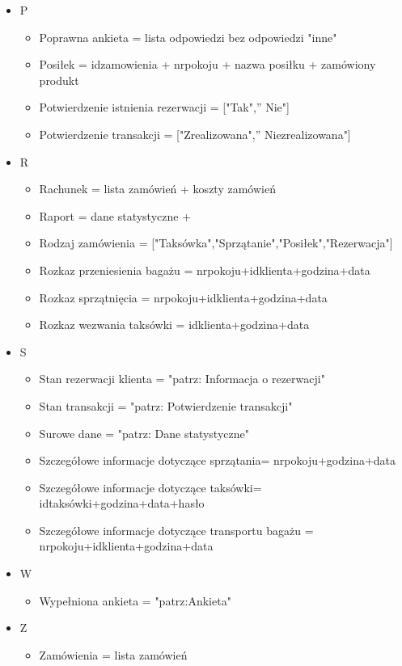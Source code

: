 \documentclass[a4paper, 11pt]{article}
\begin{document}
\begin{itemize}
		
		\item P
		\begin{itemize}
			\item Poprawna ankieta = lista odpowiedzi bez odpowiedzi "inne"
			\item Posiłek = idzamowienia + nrpokoju + nazwa posiłku + zamówiony produkt
			\item Potwierdzenie istnienia rezerwacji = ["Tak",'' Nie"]
			\item Potwierdzenie transakcji = ["Zrealizowana",'' Niezrealizowana"]
		\end{itemize}
		\item R
		\begin{itemize}
			\item Rachunek = lista zamówień + koszty zamówień
			\item Raport = dane statystyczne + 
			\item Rodzaj zamówienia = ["Taksówka","Sprzątanie","Posiłek","Rezerwacja"]
			\item Rozkaz przeniesienia bagażu = nrpokoju+idklienta+godzina+data
			\item Rozkaz sprzątnięcia = nrpokoju+idklienta+godzina+data
			\item Rozkaz wezwania taksówki = idklienta+godzina+data
		\end{itemize}
		\item S
		\begin{itemize}
			\item Stan rezerwacji klienta = "patrz: Informacja o rezerwacji"
			\item Stan transakcji = "patrz: Potwierdzenie transakcji"
			\item Surowe dane = "patrz: Dane statystyczne"
			\item Szczegółowe informacje dotyczące sprzątania= nrpokoju+godzina+data
			\item Szczegółowe informacje dotyczące taksówki= idtaksówki+godzina+data+hasło
			\item Szczegółowe informacje dotyczące transportu bagażu = nrpokoju+idklienta+godzina+data
		\end{itemize}
		\item W
		\begin{itemize}
			\item Wypełniona ankieta = "patrz:Ankieta"
		\end{itemize}
		\item Z
		\begin{itemize}
			\item Zamówienia = lista zamówień

\end{itemize}
\end{itemize}
\end{document}
